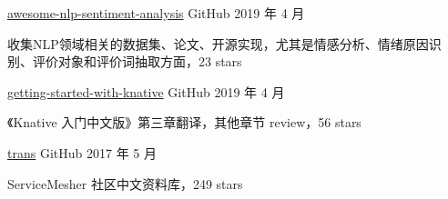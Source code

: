 

\begin{cventries}

  \cventry
    {} %
    {\href{haiker2011/awesome-nlp-sentiment-analysis}{awesome-nlp-sentiment-analysis}} %
    {GitHub} %
    {2019 年 4 月} %
    {
      \begin{cvitems} %
        \item 收集NLP领域相关的数据集、论文、开源实现，尤其是情感分析、情绪原因识别、评价对象和评价词抽取方面，23 stars
      \end{cvitems}
    }

  \cventry
    {} %
    {\href{https://github.com/servicemesher/getting-started-with-knative}{getting-started-with-knative}} %
    {GitHub} %
    {2019 年 4 月} %
    {
      \begin{cvitems} %
        \item 《Knative 入门中文版》第三章翻译，其他章节 review，56 stars
      \end{cvitems}
    }

  \cventry
    {} %
    {\href{https://github.com/servicemesher/trans}{trans}} %
    {GitHub} %
    {2017 年 5 月} %
    {
      \begin{cvitems} %
        \item ServiceMesher 社区中文资料库，249 stars
      \end{cvitems}
    }




\end{cventries}